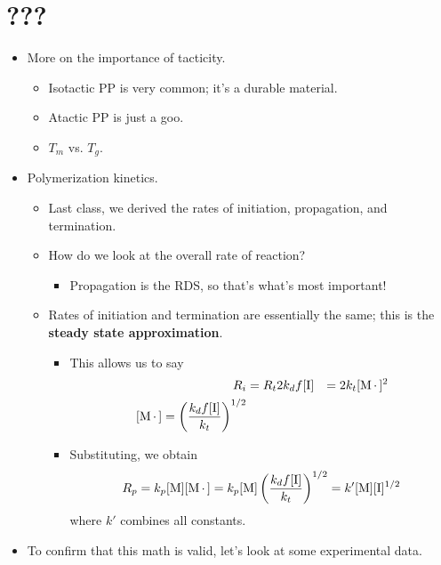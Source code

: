 \documentclass[../notes.tex]{subfiles}
\begin{document}
\section{???}
\begin{itemize}
    \item {}More on the importance of tacticity.
    \begin{itemize}
        \item Isotactic PP is very common; it's a durable material.
        \item Atactic PP is just a goo.
        \item $T_m$ vs. $T_g$.
    \end{itemize}
    \item Polymerization kinetics.
    \begin{itemize}
        \item Last class, we derived the rates of initiation, propagation, and termination.
        \item How do we look at the overall rate of reaction?
        \begin{itemize}
            \item Propagation is the RDS, so that's what's most important!
        \end{itemize}
        \item Rates of initiation and termination are essentially the same; this is the \textbf{steady state approximation}.
        \begin{itemize}
            \item This allows us to say
            \begin{align*}
                R_i &= R_t
                2k_df[\ce{I}] &= 2k_t[\ce{M*}]^2\\
                [\ce{M*}] = \left( \frac{k_df[\ce{I}]}{k_t} \right)^{1/2}
            \end{align*}
            \item Substituting, we obtain
            \begin{equation*}
                R_p = k_p[\ce{M}][\ce{M*}]
                = k_p[\ce{M}]\left( \frac{k_df[\ce{I}]}{k_t} \right)^{1/2}
                = k'[\ce{M}][\ce{I}]^{1/2}
            \end{equation*}
            where $k'$ combines all constants.
        \end{itemize}
    \end{itemize}
    \item To confirm that this math is valid, let's look at some experimental data.

\end{itemize}
\end{document}
